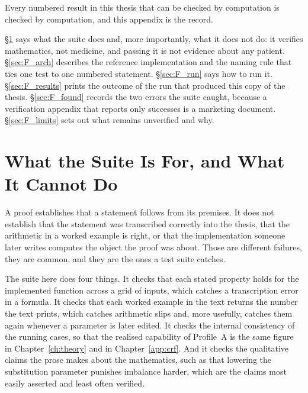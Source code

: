 
\label{app:verification}

\begin{ataglance}
Every numbered result in this thesis that can be checked by computation is
checked by computation, and this appendix is the record.

\S\ref{sec:F_why} says what the suite does and, more importantly, what it does
not do: it verifies mathematics, not medicine, and passing it is not evidence
about any patient. \S\ref{sec:F_arch} describes the reference implementation
and the naming rule that ties one test to one numbered statement.
\S\ref{sec:F_run} says how to run it. \S\ref{sec:F_results} prints the outcome
of the run that produced this copy of the thesis. \S\ref{sec:F_found} records
the two errors the suite caught, because a verification appendix that reports
only successes is a marketing document. \S\ref{sec:F_limits} sets out what
remains unverified and why.
\end{ataglance}

\section{What the Suite Is For, and What It Cannot Do}
\label{sec:F_why}

A proof establishes that a statement follows from its premises. It does not
establish that the statement was transcribed correctly into the thesis, that
the arithmetic in a worked example is right, or that the implementation someone
later writes computes the object the proof was about. Those are different
failures, they are common, and they are the ones a test suite catches.

The suite here does four things. It checks that each stated property holds for
the implemented function across a grid of inputs, which catches a
transcription error in a formula. It checks that each worked example in the
text returns the number the text prints, which catches arithmetic slips and,
more usefully, catches them again whenever a parameter is later edited. It
checks the internal consistency of the running cases, so that the realised
capability of Profile~A is the same figure in Chapter~\ref{ch:theory} and in
Chapter~\ref{app:crf}. And it checks the qualitative claims the prose makes
about the mathematics, such as that lowering the substitution parameter
punishes imbalance harder, which are the claims most easily asserted and least
often verified.

